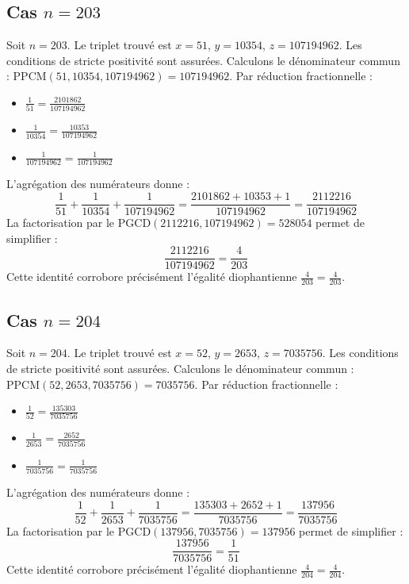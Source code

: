 \documentclass[11pt,a4paper]{article}
\begin{document}
\subsection{Cas $n = 203$}
Soit $n = 203$. Le triplet trouvé est $x = 51$, $y = 10354$, $z = 107194962$.
Les conditions de stricte positivité sont assurées.
Calculons le dénominateur commun : $\text{PPCM}(51, 10354, 107194962) = 107194962$.
Par réduction fractionnelle :
\begin{itemize}
    \item $\frac{1}{51} = \frac{2101862}{107194962}$
    \item $\frac{1}{10354} = \frac{10353}{107194962}$
    \item $\frac{1}{107194962} = \frac{1}{107194962}$
\end{itemize}
L'agrégation des numérateurs donne :
$$ \frac{1}{51} + \frac{1}{10354} + \frac{1}{107194962} = \frac{2101862 + 10353 + 1}{107194962} = \frac{2112216}{107194962} $$
La factorisation par le $\text{PGCD}(2112216, 107194962) = 528054$ permet de simplifier :
$$ \frac{2112216}{107194962} = \frac{4}{203} $$
Cette identité corrobore précisément l'égalité diophantienne $\frac{4}{203} = \frac{4}{203}$.

\subsection{Cas $n = 204$}
Soit $n = 204$. Le triplet trouvé est $x = 52$, $y = 2653$, $z = 7035756$.
Les conditions de stricte positivité sont assurées.
Calculons le dénominateur commun : $\text{PPCM}(52, 2653, 7035756) = 7035756$.
Par réduction fractionnelle :
\begin{itemize}
    \item $\frac{1}{52} = \frac{135303}{7035756}$
    \item $\frac{1}{2653} = \frac{2652}{7035756}$
    \item $\frac{1}{7035756} = \frac{1}{7035756}$
\end{itemize}
L'agrégation des numérateurs donne :
$$ \frac{1}{52} + \frac{1}{2653} + \frac{1}{7035756} = \frac{135303 + 2652 + 1}{7035756} = \frac{137956}{7035756} $$
La factorisation par le $\text{PGCD}(137956, 7035756) = 137956$ permet de simplifier :
$$ \frac{137956}{7035756} = \frac{1}{51} $$
Cette identité corrobore précisément l'égalité diophantienne $\frac{4}{204} = \frac{4}{204}$.
\end{document}
